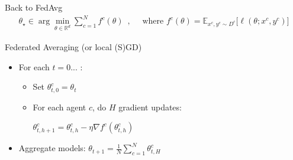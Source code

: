 \documentclass[aspectratio=169,14pt]{beamer}
\begin{document}
  
  \begin{frame}[t]{Back to FedAvg}
    \vspace{-3em}
    \begin{align*}
      \theta_\star \in \arg\min_{\theta \in \mathbb{R}^d} 
      \sum_{c=1}^N f^c(\theta)
      \enspace,
      \quad
      \text{ where }
      f^c(\theta) = \mathbb{E}_{x^c, y^c \sim D^c} \Big[ \ell( \theta; x^c, y^c ) \Big]
    \end{align*}
    
    \vspace{-1em}

    Federated Averaging (or local (S)GD)

    \vspace{-0.5em}
    
    \begin{itemize}
    \item For each $t = 0 ...$ :
      \begin{itemize}
        \normalsize
      \item Set $\theta_{t,0}^c = \theta_t$
      \item For each agent $c$, do $H$ gradient updates: \\[0.5em]
        
        \begin{center}
          $\theta_{t,h+1}^c = \theta_{t,h}^c - \eta \nabla f^c( \theta_{t,h}^c )$
        \end{center}
        
        \vspace{0.5em}
        
      \end{itemize}
    \item Aggregate models: $\theta_{t+1} = \frac{1}{N} \sum_{c=1}^N \theta_{t,H}^c$
    \end{itemize}

    \vspace{0.5em}


    
  \end{frame}
\end{document}
